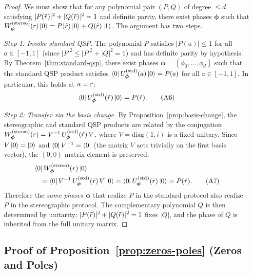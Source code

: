 \begin{proof}
	We must show that for any polynomial pair $(P, Q)$ of
	degree $\leq d$ satisfying $|P(\tilde{r})|^2 + |Q(\tilde{r})|^2 = 1$
	and definite parity, there exist phases $\bm{\phi}$ such
	that $W_{\bm{\phi}}^{(\mathrm{stereo})}(r)\ket{0} =
		P(\tilde{r})\ket{0} + Q(\tilde{r})\ket{1}$.  The argument
	has two steps.

	\textit{Step 1: Invoke standard QSP.}
	The polynomial $P$ satisfies $|P(a)| \leq 1$ for all
	$a \in [-1,1]$ (since $|P|^2 \leq |P|^2 + |Q|^2 = 1$)
	and has definite parity by hypothesis.  By
	Theorem~\ref{thm:standard-qsp}, there exist phases
	$\bm{\phi} = (\phi_0, \ldots, \phi_d)$ such that the
	standard QSP product satisfies
	$\bra{0}U_{\bm{\phi}}^{(\mathrm{std})}(a)\ket{0} = P(a)$
	for all $a \in [-1,1]$.  In particular, this holds at
	$a = \tilde{r}$:
	\begin{equation}
		\bra{0}U_{\bm{\phi}}^{(\mathrm{std})}(\tilde{r})\ket{0} = P(\tilde{r}).
		\tag{A6}
	\end{equation}

	\textit{Step 2: Transfer via the basis change.}
	By Proposition~\ref{prop:basis-change}, the stereographic
	and standard QSP products are related by the conjugation
	$W_{\bm{\phi}}^{(\mathrm{stereo})}(r)
		= V^{-1}\,U_{\bm{\phi}}^{(\mathrm{std})}(\tilde{r})\,V$,
	where $V = \mathrm{diag}(1, i)$ is a fixed unitary.
	Since $V\ket{0} = \ket{0}$ and
	$\bra{0}V^{-1} = \bra{0}$ (the matrix $V$ acts trivially
	on the first basis vector), the $(0,0)$ matrix element is
	preserved:
	\begin{align}
		&\bra{0}W_{\bm{\phi}}^{(\mathrm{stereo})}(r)\ket{0}
		\nonumber\\
		&\quad= \bra{0}V^{-1}\,U_{\bm{\phi}}^{(\mathrm{std})}(\tilde{r})\,V\ket{0}
		= \bra{0}U_{\bm{\phi}}^{(\mathrm{std})}(\tilde{r})\ket{0}
		= P(\tilde{r}).
		\tag{A7}
	\end{align}
	Therefore the \emph{same phases} $\bm{\phi}$ that
	realize $P$ in the standard protocol also realize $P$
	in the stereographic protocol.  The complementary
	polynomial $Q$ is then determined by unitarity:
	$|P(\tilde{r})|^2 + |Q(\tilde{r})|^2 = 1$ fixes $|Q|$, and
	the phase of $Q$ is inherited from the full unitary
	matrix.
\end{proof}


\subsection*{Proof of Proposition~\ref{prop:zeros-poles} (Zeros and Poles)}

